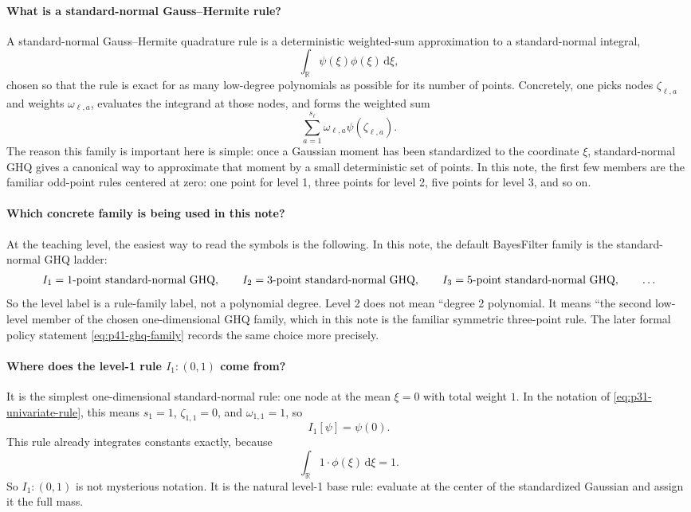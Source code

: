 \documentclass[11pt]{article}
\numberwithin{equation}{section}
\newcommand{\R}{\mathbb R}
\newcommand{\dd}{\,\mathrm d}
\begin{document}
\paragraph{What is a standard-normal Gauss--Hermite rule?}
A standard-normal Gauss--Hermite quadrature rule is a deterministic weighted-sum
approximation to a standard-normal integral,
\[
  \int_{\R}\psi(\xi)\phi(\xi)\dd\xi,
\]
chosen so that the rule is exact for as many low-degree polynomials as possible
for its number of points.  Concretely, one picks nodes
\(\zeta_{\ell,a}\) and weights \(\omega_{\ell,a}\), evaluates the integrand at
those nodes, and forms the weighted sum
\[
  \sum_{a=1}^{s_\ell}\omega_{\ell,a}\psi(\zeta_{\ell,a}).
\]
The reason this family is important here is simple: once a Gaussian moment has
been standardized to the coordinate \(\xi\), standard-normal GHQ gives a canonical
way to approximate that moment by a small deterministic set of points.  In this
note, the first few members are the familiar odd-point rules centered at zero:
one point for level 1, three points for level 2, five points for level 3, and so
on.

\paragraph{Which concrete family is being used in this note?}
At the teaching level, the easiest way to read the symbols is the following.  In
this note, the default BayesFilter family is the standard-normal GHQ ladder:
\[
  I_1=\hbox{1-point standard-normal GHQ},
  \qquad
  I_2=\hbox{3-point standard-normal GHQ},
  \qquad
  I_3=\hbox{5-point standard-normal GHQ},
  \qquad \ldots
\]
So the level label is a rule-family label, not a polynomial degree.  Level 2 does
not mean ``degree 2 polynomial.  It means ``the second low-level member of the
chosen one-dimensional GHQ family, which in this note is the familiar symmetric
three-point rule.  The later formal policy statement
\eqref{eq:p41-ghq-family} records the same choice more precisely.

\paragraph{Where does the level-1 rule \texorpdfstring{\(I_1:(0,1)\)}{I1:(0,1)} come from?}
It is the simplest one-dimensional standard-normal rule: one node at the mean
\(\xi=0\) with total weight \(1\).  In the notation of
\eqref{eq:p31-univariate-rule}, this means \(s_1=1\),
\(\zeta_{1,1}=0\), and \(\omega_{1,1}=1\), so
\[
  I_1[\psi]=\psi(0).
\]
This rule already integrates constants exactly, because
\[
  \int_{\R}1\cdot\phi(\xi)\dd\xi=1.
\]
So \(I_1:(0,1)\) is not mysterious notation.  It is the natural level-1 base
rule: evaluate at the center of the standardized Gaussian and assign it the full
mass.
\end{document}
